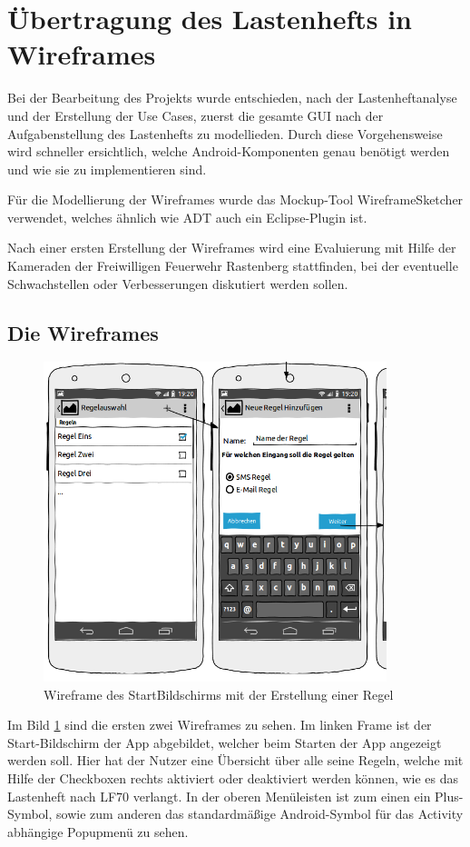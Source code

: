 \section{\"Ubertragung des Lastenhefts in Wireframes}
\label{Wireframes}

Bei der Bearbeitung des Projekts wurde entschieden, nach der Lastenheftanalyse und der Erstellung der Use Cases, zuerst die gesamte GUI nach der Aufgabenstellung des Lastenhefts zu modellieden. Durch diese Vorgehensweise wird schneller ersichtlich, welche Android-Komponenten genau ben\"otigt werden und wie sie zu implementieren sind.

F\"ur die Modellierung der Wireframes wurde das Mockup-Tool WireframeSketcher verwendet, welches \"ahnlich wie \ac{ADT} auch ein Eclipse-Plugin ist. 

Nach einer ersten Erstellung der Wireframes wird eine Evaluierung mit Hilfe der Kameraden der Freiwilligen Feuerwehr Rastenberg stattfinden, bei der eventuelle Schwachstellen oder Verbesserungen diskutiert werden sollen.

\subsection{Die Wireframes}
  
\begin{figure}
\vspace{-13pt}
\includegraphics[width=10cm]{Bilder/StartBildschirm.png}
\caption{Wireframe des StartBildschirms mit der Erstellung einer Regel}
\label{Wireframe StartBildschirm}
\vspace{-10pt}
\end{figure}
Im Bild \ref{Wireframe StartBildschirm} sind die ersten zwei Wireframes zu sehen. Im linken Frame ist der Start-Bildschirm der App abgebildet, welcher beim Starten der App angezeigt werden soll. Hier hat der Nutzer eine \"Ubersicht \"uber alle seine Regeln, welche mit Hilfe der Checkboxen rechts aktiviert oder deaktiviert werden k\"onnen, wie es das Lastenheft nach LF70 verlangt. In der oberen Men\"uleisten ist zum einen ein Plus-Symbol, sowie zum anderen das standardm\"a\ss{}ige Android-Symbol f\"ur das Activity abh\"angige Popupmen\"u zu sehen.

